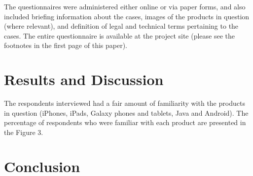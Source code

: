\documentclass[prodmode,cs196]{acmlarge}
\begin{document}
The questionnaires were administered either online or via paper forms, and also included briefing information about the cases, images of the products in question (where relevant), and definition of legal and technical terms pertaining to the cases. The entire questionnaire is available at the project site (please see the footnotes in the first page of this paper).

\section{Results and Discussion}

The respondents interviewed had a fair amount of familiarity with the products in question (iPhones, iPads, Galaxy phones and tablets, Java and Android). The percentage of respondents who were familiar with each product are presented in the Figure 3.

\begin{figure}[H]
	\begin{bchart}[min=0, step=10 ,max=100]
            \smallskip
            \medskip
            \bigskip
    \end{bchart}
\end{figure}

\section{Conclusion}

\nocite{AppleiPhoneDesignPatent}

\label{sect:bib}

{}
\end{document}
